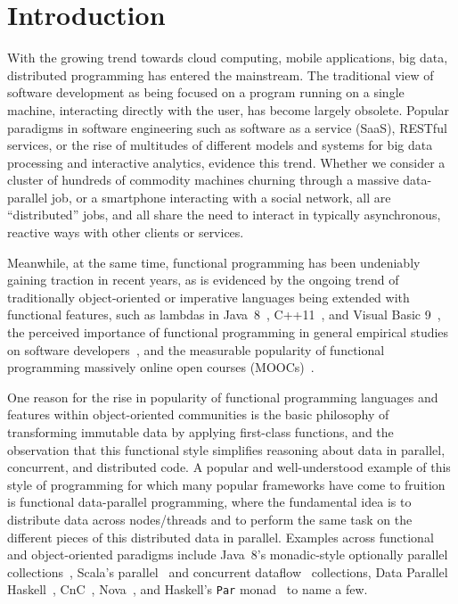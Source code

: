 \documentclass{llncs}
\begin{document}
\begin{abstract}
\end{abstract}
%
\section{Introduction}

With the growing trend towards cloud computing, mobile applications, big data,
distributed programming has entered the mainstream. The
traditional view of software development as being focused on a program running
on a single machine, interacting directly with the user, has become largely
obsolete. Popular paradigms in software engineering such as software as a
service (SaaS), RESTful services, or the rise of multitudes of different
models and systems for big data processing and interactive analytics, evidence
this trend. Whether we consider a cluster of hundreds of commodity machines
churning through a massive data-parallel job, or a smartphone interacting with
a social network, all are ``distributed'' jobs, and all share the need to
interact in typically asynchronous, reactive ways with other clients or
services.

Meanwhile, at the same time, functional programming has been undeniably
gaining traction in recent years, as is evidenced by the ongoing trend of
traditionally object-oriented or imperative languages being extended with
functional features, such as lambdas in \mbox{Java 8}~\cite{JavaLambdas},
C++11~\cite{CplusplusLambas}, and Visual Basic 9~\cite{Meijer}, the perceived
importance of functional programming in general empirical studies on software
developers~\cite{PLAdoption}, and the measurable popularity of functional
programming massively online open courses (MOOCs)~\cite{ICSEMOOC}.

One reason for the rise in popularity of functional programming languages and
features within object-oriented communities is the basic philosophy of
transforming immutable data by applying first-class functions, and the
observation that this functional style simplifies reasoning about data in
parallel, concurrent, and distributed code. A popular and well-understood
example of this style of programming for which many popular frameworks have
come to fruition is functional data-parallel programming, where the
fundamental idea is to distribute data across nodes/threads and to perform the
same task on the different pieces of this distributed data in parallel.
Examples across functional and object-oriented paradigms include \mbox{Java
8}'s monadic-style optionally parallel collections~\cite{JavaLambdas}, Scala's
parallel~\cite{ScalaParColls} and concurrent dataflow~\cite{FlowPools}
collections, Data Parallel Haskell~\cite{DataParallelHaskell}, CnC~\cite{CnC}, Nova~\cite{Nova}, and Haskell's \verb|Par|
monad~\cite{HaskellPar} to name a few.
\end{document}
